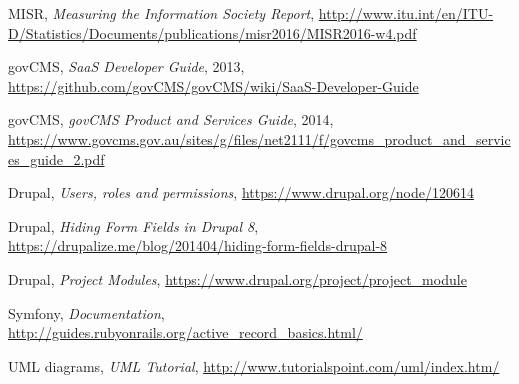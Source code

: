 \begin{thebibliography}{99999}
\singlespace\normalsize

 MISR, \textit{Measuring the Information Society Report}, \url{http://www.itu.int/en/ITU-D/Statistics/Documents/publications/misr2016/MISR2016-w4.pdf} %

 govCMS, \textit{SaaS Developer Guide}, 2013, \url{https://github.com/govCMS/govCMS/wiki/SaaS-Developer-Guide} %

 govCMS, \textit{govCMS Product and Services Guide}, 2014, \url{https://www.govcms.gov.au/sites/g/files/net2111/f/govcms_product_and_services_guide_2.pdf} %

 Drupal, \textit{Users, roles and permissions}, \url{https://www.drupal.org/node/120614} %

 Drupal, \textit{Hiding Form Fields in Drupal 8}, \url{https://drupalize.me/blog/201404/hiding-form-fields-drupal-8} %

 Drupal, \textit{Project Modules}, \url{https://www.drupal.org/project/project_module} %

 Symfony, \textit{Documentation}, \url{http://guides.rubyonrails.org/active_record_basics.html/} %

 UML diagrams, \textit{UML Tutorial}, \url{http://www.tutorialspoint.com/uml/index.htm/} %

\end{thebibliography}

